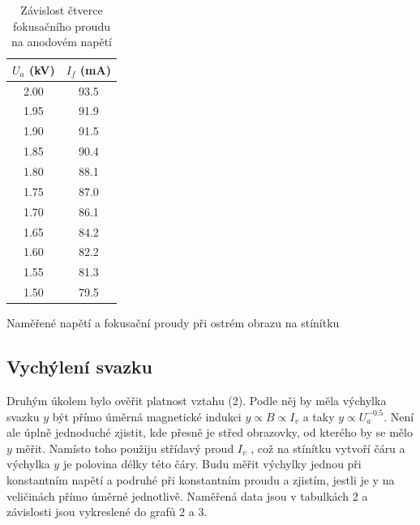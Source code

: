 \documentclass[a4paper,11pt]{article}
\begin{document}
\begin{table}[h]
    \begin{minipage}{.40\linewidth}
        \centering
        \begin{tabular}{| c c |}
            \hline
            $ U_a $ (kV)  &  $ I_f $ (mA) \\
            \hline
            2.00 & 93.5 \\
            1.95 & 91.9 \\
            1.90 & 91.5 \\
            1.85 & 90.4 \\
            1.80 & 88.1 \\
            1.75 & 87.0 \\
            1.70 & 86.1 \\
            1.65 & 84.2 \\
            1.60 & 82.2 \\
            1.55 & 81.3 \\
            1.50 & 79.5 \\
            \hline
        \end{tabular}
        \caption{Naměřené napětí a fokusační proudy při ostrém obrazu na stínítku}
    \end{minipage} 
    \hfill
    \begin{minipage}{.5\linewidth}
        \centering
        \resizebox{\textwidth}{!}{  }
        \captionsetup{type=graph}
        \caption{Závislost čtverce fokusačního proudu na anodovém napětí}
    \end{minipage} 
\end{table}

\subsection{Vychýlení svazku}

Druhým úkolem bylo ověřit platnost vztahu (2). Podle něj by měla výchylka svazku $ y $ být přímo úměrná magnetické indukci $ y \propto B \propto I_v $ a taky $ y \propto U_a^{-0.5} $. Není ale úplně jednoduché zjistit, kde přesně je střed obrazovky, od kterého by se mělo $ y $  měřit. Namísto toho použiju střídavý proud $ I_v $ , což na stínítku vytvoří čáru a výchylka $ y $ je polovina délky této čáry. Budu měřit výchylky jednou při konstantním napětí a podruhé při konstantním proudu a zjistím, jestli je y na veličinách přímo úměrné jednotlivě. Naměřená data jsou v tabulkách 2 a závislosti jsou vykreslené do grafů 2 a 3. 
\end{document}
